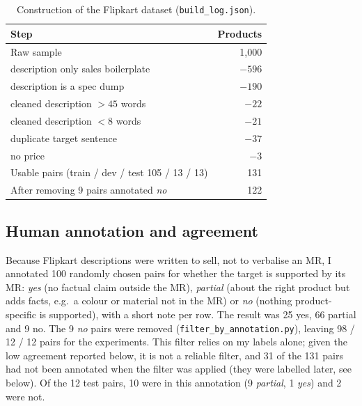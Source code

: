 \documentclass[11pt]{article}
\begin{document}
\begin{table}[t]
\centering\small
\begin{tabular}{@{}lr@{}}
\toprule
Step & Products \\
\midrule
Raw sample & 1,000 \\
\quad description only sales boilerplate & $-596$ \\
\quad description is a spec dump & $-190$ \\
\quad cleaned description $>45$ words & $-22$ \\
\quad cleaned description $<8$ words & $-21$ \\
\quad duplicate target sentence & $-37$ \\
\quad no price & $-3$ \\
Usable pairs (train / dev / test 105 / 13 / 13) & 131 \\
After removing 9 pairs annotated \textit{no} & 122 \\
\bottomrule
\end{tabular}
\caption{Construction of the Flipkart dataset (\texttt{build\_log.json}).}
\label{tab:build}
\end{table}

\subsection{Human annotation and agreement}\label{sec:annotation}
Because Flipkart descriptions were written to sell, not to verbalise an MR, I annotated 100 randomly chosen pairs for whether the target is supported by its MR: \emph{yes} (no factual claim outside the MR), \emph{partial} (about the right product but adds facts, e.g.\ a colour or material not in the MR) or \emph{no} (nothing product-specific is supported), with a short note per row. The result was 25 yes, 66 partial and 9 no. The 9 \emph{no} pairs were removed (\texttt{filter\_by\_annotation.py}), leaving 98 / 12 / 12 pairs for the experiments. This filter relies on my labels alone; given the low agreement reported below, it is not a reliable filter, and 31 of the 131 pairs had not been annotated when the filter was applied (they were labelled later, see below). Of the 12 test pairs, 10 were in this annotation (9 \emph{partial}, 1 \emph{yes}) and 2 were not.
\end{document}
